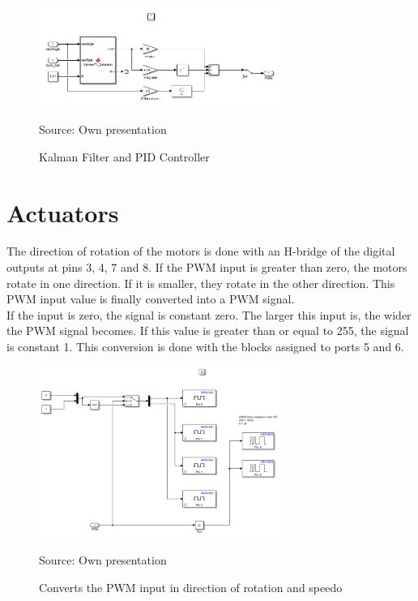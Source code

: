 %
	
	\begin{figure}[H]
		\centering
		\includegraphics[width=0.7\textwidth]{figures/controller.PNG}
		\caption{Kalman Filter and PID Controller}	
		Source: Own presentation	
		\label{fig:controller}	
	\end{figure}


\section{Actuators}
The direction of rotation of the motors is done with an H-bridge of the digital outputs at pins 3, 4, 7 and 8. If the PWM input is greater than zero, the motors rotate in one direction. If it is smaller, they rotate in the other direction.
This PWM input value is finally converted into a PWM signal.\\
If the input is zero, the signal is constant zero. The larger this input is, the wider the PWM signal becomes. If this value is greater than or equal to 255, the signal is constant 1. This conversion is done with the blocks assigned to ports 5 and 6.

	\begin{figure}[H]
		\centering
		\includegraphics[width=0.7\textwidth]{figures/act.PNG}
		\caption{Converts the PWM input in direction of rotation and speedo}	
		Source: Own presentation	
		\label{fig:act}	
	\end{figure}


